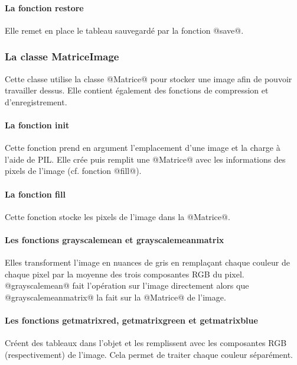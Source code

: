 \documentclass{article}
\begin{document}
\paragraph{La fonction restore}

Elle remet en place le tableau sauvegardé par la fonction @save@.




\subsubsection{La classe MatriceImage}

Cette classe utilise la classe @Matrice@ pour stocker une image afin de pouvoir travailler dessus. Elle contient également des fonctions de compression et d'enregistrement.

\paragraph{La fonction init}

Cette fonction prend en argument l'emplacement d'une image et la charge à l'aide de PIL. Elle crée puis remplit une @Matrice@ avec les informations des pixels de l'image (cf. fonction @fill@).

\paragraph{La fonction fill}

Cette fonction stocke les pixels de l'image dans la @Matrice@.

\paragraph{Les fonctions grayscalemean et grayscalemeanmatrix}

Elles transforment l'image en nuances de gris en remplaçant chaque couleur de chaque pixel par la moyenne des trois composantes RGB du pixel.
@grayscalemean@ fait l'opération sur l'image directement alors que @grayscalemeanmatrix@ la fait sur la @Matrice@ de l'image.

\paragraph{Les fonctions getmatrixred, getmatrixgreen et getmatrixblue}

Créent des tableaux dans l'objet et les remplissent avec les composantes RGB (respectivement) de l'image. Cela permet de traiter chaque couleur séparément.
\end{document}
